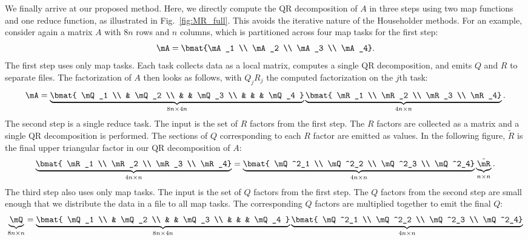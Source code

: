 \documentclass[10pt, conference, compsocconf]{IEEEtran}
\begin{document}
We finally arrive at our proposed method.  Here, we directly compute the QR decomposition of $A$ in three steps using two map functions and one reduce function, as illustrated in Fig.~\ref{fig:MR_full}.  This avoids the iterative nature of the Householder methods.  For an example, consider again a matrix $A$ with $8n$ rows and $n$ columns, which is partitioned across four map tasks for the first step:
\[ 
\mA = \bmat{\mA_1 \\ \mA_2 \\ \mA_3 \\ \mA_4}. 
\]
The first step uses only map tasks.  Each task collects data as a local matrix, computes a single QR decomposition, and emits $Q$ and $R$ to separate files.  The factorization of $A$ then looks as follows, with $Q_jR_j$ the computed factorization on the $j$th task:
\[ 
\mA = \underbrace{\bmat{ \mQ_1 \\ & \mQ_2 \\ & & \mQ_3 \\ & & & \mQ_4 }}_{8n \times 4n}
      \underbrace{\bmat{ \mR_1 \\ \mR_2 \\ \mR_3 \\ \mR_4}}_{4n \times n} .
\]
The second step is a single reduce task.  The input is the set of $R$ factors from the first step.  The $R$ factors are collected as a matrix and a single QR decomposition is performed.  The sections of $Q$ corresponding to each $R$ factor are emitted as values.  In the following figure, $\tilde{R}$ is the final upper triangular factor in our QR decomposition of $A$:
\[
\underbrace{\bmat{ \mR_1 \\ \mR_2 \\ \mR_3 \\ \mR_4}}_{4n \times n} = 
\underbrace{\bmat{ \mQ^2_1 \\ \mQ^2_2 \\ \mQ^2_3 \\ \mQ^2_4}}_{4n \times n}
\underbrace{\tilde{\mR}}_{n \times n} .
\]
The third step also uses only map tasks.  The input is the set of $Q$ factors from the first step.  The $Q$ factors from the second step are small enough that we distribute the data in a file to all map tasks.  The corresponding $Q$ factors are multiplied together to emit the final $Q$:
\[
 \underbrace{\mQ}_{8n \times n} = \underbrace{\bmat{ \mQ_1 \\ & \mQ_2 \\ & & \mQ_3 \\ & & & \mQ_4 }}_{8n \times 4n}
           \underbrace{\bmat{ \mQ^2_1 \\ \mQ^2_2 \\ \mQ^2_3 \\ \mQ^2_4}}_{4n \times n}
\]
\end{document}
